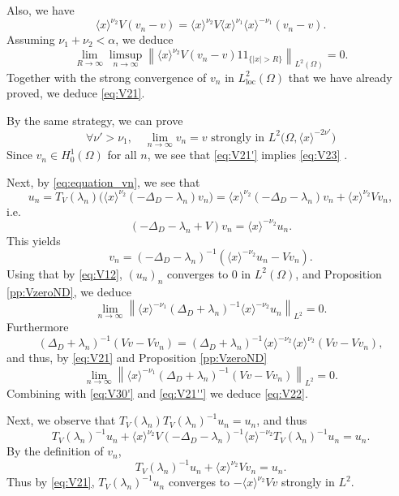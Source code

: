 \documentclass[10pt,leqno]{amsart}
\DeclareMathOperator{\loc}{loc}
\theoremstyle{definition}%
\theoremstyle{remark}
\numberwithin{equation}{section}
\newcommand{\indic}{1\!\!1}
\renewcommand{\^}{\widehat}%
\begin{document}
Also, we have 
$$\langle x\rangle^{\nu_2}V (v_n-v)=\langle x\rangle^{\nu_2} V \langle x\rangle^{\nu_1}  \langle x\rangle^{-\nu_1}(v_n-v).$$
Assuming $\nu_1+\nu_2<\alpha$, we deduce
$$\lim_{R\to\infty}\limsup_{n\to\infty}\left\|\langle x\rangle^{\nu_2}V (v_n-v)\indic_{\{|x|>R\}}\right\|_{L^2(\Omega)}=0.$$
Together with the strong convergence of $v_n$ in $L^2_{\loc}(\Omega)$ that we have already proved, we deduce \eqref{eq:V21}.

By the same strategy, we can prove
\begin{equation}
 \label{eq:V21''}
 \forall \nu'>\nu_1,\quad \lim_{n\to\infty} v_n=v \text{ strongly in }L^2\Big(\Omega,\langle x\rangle^{-2\nu'}\Big)
\end{equation} 
Since $v_n\in H^1_0(\Omega)$ for all $n$, we see that \eqref{eq:V21'} implies \eqref{eq:V23} .

Next, by \eqref{eq:equation_vn}, we see that 
$$u_n=T_V(\lambda_n)\Big( \langle x \rangle^{\nu_2} (-\Delta_D-\lambda_n)v_n \Big)=\langle x\rangle^{\nu_2} \left( -\Delta_D-\lambda_n \right)v_n+\langle x\rangle^{\nu_2} V v_n,$$
i.e.
\begin{equation}
\label{eq:V30}
(-\Delta_D-\lambda_n+V)v_n=\langle x\rangle^{-\nu_2} u_n.
\end{equation} 
This yields 
\begin{equation}
\label{eq:V30'}
v_n=\left( -\Delta_D-\lambda_n \right)^{-1}\left( \langle x\rangle^{-\nu_2}u_n-Vv_n \right).
\end{equation} 
Using that by \eqref{eq:V12}, $(u_n)_n$ converges to $0$ in $L^2(\Omega)$, and Proposition \ref{pp:VzeroND}, we deduce
$$ \lim_{n\to\infty} \left\| \langle x\rangle^{-\nu_1} (\Delta_D+\lambda_n)^{-1}\langle x\rangle^{-\nu_2}u_n\right\|_{L^2}=0.$$
Furthermore
$$\left( \Delta_D+\lambda_n \right)^{-1}\left( Vv-Vv_n \right)=\left( \Delta_D+\lambda_n \right)^{-1}\langle x\rangle^{-\nu_2} \langle x\rangle^{\nu_2} \left( Vv-Vv_n \right),$$
and thus, by \eqref{eq:V21} and Proposition \ref{pp:VzeroND}
$$\lim_{n\to\infty} \left\|\langle x\rangle^{-\nu_1} \left( \Delta_D+\lambda_n \right)^{-1} \left( Vv-Vv_n \right)\right\|_{L^2}=0.$$
Combining with \eqref{eq:V30'} and \eqref{eq:V21''} we deduce \eqref{eq:V22}.

Next, we observe that $T_V(\lambda_n)T_V(\lambda_n)^{-1}u_n=u_n$, and thus
$$ T_V(\lambda_n)^{-1}u_n+\langle x\rangle^{\nu_2}V \left( -\Delta_D-\lambda_n \right)^{-1}\langle x\rangle^{-\nu_2} T_V\left( \lambda_n \right)^{-1}u_n=u_n.$$
By the definition of $v_n$, 
$$T_V(\lambda_n)^{-1}u_n+\langle x\rangle^{\nu_2} Vv_n=u_n.$$
Thus by \eqref{eq:V21}, $T_V(\lambda_n)^{-1}u_n$ converges to $-\langle x\rangle^{\nu_2}Vv$ strongly in $L^2$. 
\end{document}
